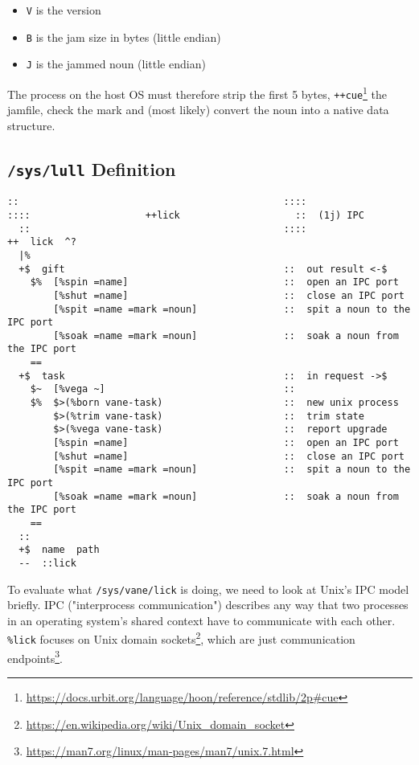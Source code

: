 \documentclass[twoside]{article}
\begin{document}
\begin{itemize}
  \item \texttt{V} is the version
  \item \texttt{B} is the jam size in bytes (little endian)
  \item \texttt{J} is the jammed noun (little endian)
\end{itemize}

The process on the host OS must therefore strip the first 5 bytes, \texttt{++cue}\footnote{\url{https://docs.urbit.org/language/hoon/reference/stdlib/2p#cue}} the jamfile, check the mark and (most likely) convert the noun into a native data structure.

\subsection{\texttt{/sys/lull} Definition}

\begin{verbatim}
::                                              ::::
::::                    ++lick                    ::  (1j) IPC
  ::                                            ::::
++  lick  ^?
  |%
  +$  gift                                      ::  out result <-$
    $%  [%spin =name]                           ::  open an IPC port
        [%shut =name]                           ::  close an IPC port
        [%spit =name =mark =noun]               ::  spit a noun to the IPC port
        [%soak =name =mark =noun]               ::  soak a noun from the IPC port
    ==
  +$  task                                      ::  in request ->$
    $~  [%vega ~]                               ::
    $%  $>(%born vane-task)                     ::  new unix process
        $>(%trim vane-task)                     ::  trim state
        $>(%vega vane-task)                     ::  report upgrade
        [%spin =name]                           ::  open an IPC port
        [%shut =name]                           ::  close an IPC port
        [%spit =name =mark =noun]               ::  spit a noun to the IPC port
        [%soak =name =mark =noun]               ::  soak a noun from the IPC port
    ==
  ::
  +$  name  path
  --  ::lick
\end{verbatim}

To evaluate what \texttt{/sys/vane/lick} is doing, we need to look at Unix's IPC model briefly.  IPC ("interprocess communication") describes any way that two processes in an operating system's shared context have to communicate with each other.  \texttt{\%lick} focuses on Unix domain sockets\footnote{\url{https://en.wikipedia.org/wiki/Unix_domain_socket}}, which are just communication endpoints\footnote{\url{https://man7.org/linux/man-pages/man7/unix.7.html}}.
\end{document}
